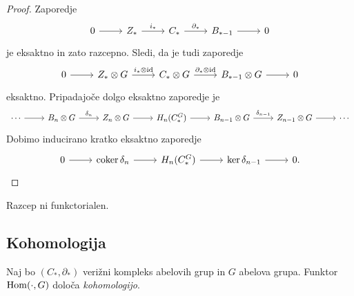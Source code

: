 \begin{proof}
Zaporedje
\[
\begin{tikzcd}
0 \arrow[r] &
Z_* \arrow[r, "i_*"] &
C_* \arrow[r, "\partial_*"] &
B_{*-1} \arrow[r] &
0
\end{tikzcd}
\]
je eksaktno in zato razcepno. Sledi, da je tudi zaporedje
\[
\begin{tikzcd}
0 \arrow[r] &
Z_* \otimes G \arrow[r, "i_* \otimes \id"] &
C_* \otimes G \arrow[r, "\partial_* \otimes \id"] &
B_{*-1} \otimes G \arrow[r] &
0
\end{tikzcd}
\]
eksaktno. Pripadajoče dolgo eksaktno zaporedje je
\[
\begin{tikzcd}
\cdots \arrow[r] &
B_n \otimes G \arrow[r, "\delta_n"] &
Z_n \otimes G \arrow[r] &
H_n(C_*^G) \arrow[r] &
B_{n-1} \otimes G \arrow[r, "\delta_{n-1}"] &
Z_{n-1} \otimes G \arrow[r] &
\cdots
\end{tikzcd}
\]
Dobimo inducirano kratko eksaktno zaporedje
\[
\begin{tikzcd}
0 \arrow[r] &
\coker \delta_n \arrow[r] &
H_n(C_*^G) \arrow[r] &
\ker \delta_{n-1} \arrow[r] &
0.
\end{tikzcd}
\]
\end{proof}

\begin{opomba}
Razcep ni funkctorialen.
\end{opomba}

\newpage

\subsection{Kohomologija}

\begin{definicija}
Naj bo $(C_*, \partial_*)$ verižni kompleks abelovih grup in $G$
abelova grupa. Funktor $\operatorname{Hom}(\cdot, G)$ določa
\emph{kohomologijo}.
\end{definicija}
